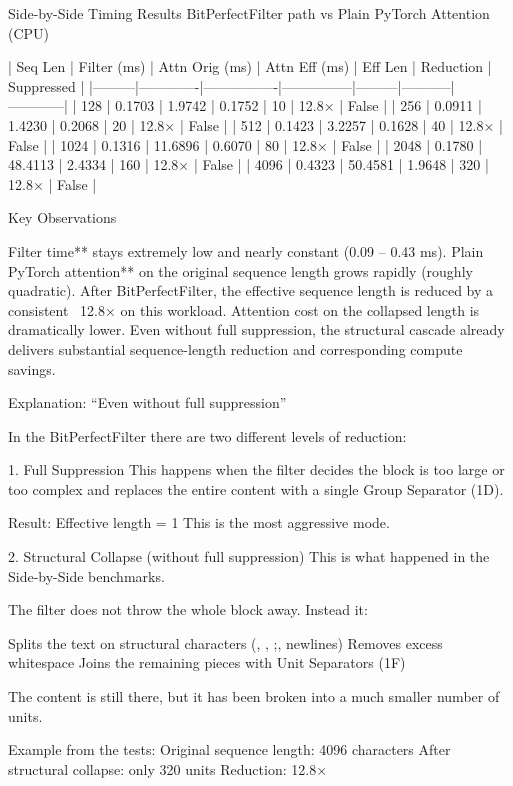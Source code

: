 Side-by-Side Timing Results  
BitPerfectFilter path vs Plain PyTorch Attention (CPU)

| Seq Len | Filter (ms) | Attn Orig (ms) | Attn Eff (ms) | Eff Len | Reduction | Suppressed |
|---------|-------------|----------------|---------------|---------|-----------|------------|
| 128     | 0.1703      | 1.9742         | 0.1752        | 10      | 12.8×     | False      |
| 256     | 0.0911      | 1.4230         | 0.2068        | 20      | 12.8×     | False      |
| 512     | 0.1423      | 3.2257         | 0.1628        | 40      | 12.8×     | False      |
| 1024    | 0.1316      | 11.6896        | 0.6070        | 80      | 12.8×     | False      |
| 2048    | 0.1780      | 48.4113        | 2.4334        | 160     | 12.8×     | False      |
| 4096    | 0.4323      | 50.4581        | 1.9648        | 320     | 12.8×     | False      |

Key Observations

Filter time** stays extremely low and nearly constant (0.09 – 0.43 ms).
Plain PyTorch attention** on the original sequence length grows rapidly (roughly quadratic).
After BitPerfectFilter, the effective sequence length is reduced by a consistent ~12.8× on this workload.
Attention cost on the collapsed length is dramatically lower.
Even without full suppression, the structural cascade already delivers substantial sequence-length reduction and corresponding compute savings.

Explanation: “Even without full suppression”

In the BitPerfectFilter there are two different levels of reduction:

1. Full Suppression
This happens when the filter decides the block is too large or too complex and replaces the entire content with a single Group Separator (\x1D).

Result: Effective length = 1
This is the most aggressive mode.

2. Structural Collapse (without full suppression)
This is what happened in the Side-by-Side benchmarks.

The filter does not throw the whole block away. Instead it:

Splits the text on structural characters ({, }, ;, newlines)
Removes excess whitespace
Joins the remaining pieces with Unit Separators (\x1F)

The content is still there, but it has been broken into a much smaller number of units.

Example from the tests:
Original sequence length: 4096 characters
After structural collapse: only 320 units
Reduction: 12.8×

